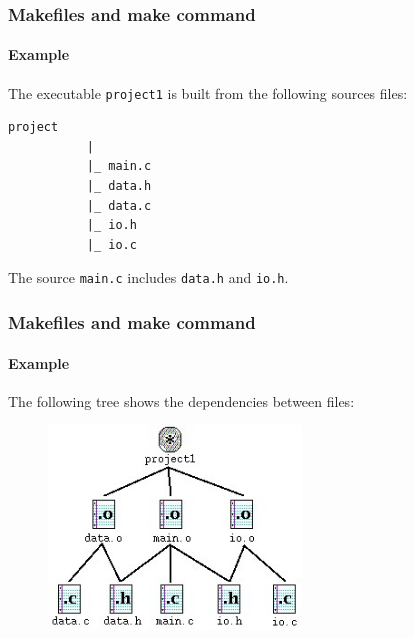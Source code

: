 \documentclass[11pt]{beamer}
\begin{document}

\lstset{%
     showstringspaces = false,
     basicstyle=\small\ttfamily,
   }

\begin{frame}[t,fragile]
  \frametitle{Makefiles and make command}
  \framesubtitle{Example}

  The executable \texttt{project1} is built from the following sources files:

  \vspace{5mm}
  \begin{lstlisting}[language=make]
         project
           |
           |_ main.c
           |_ data.h
           |_ data.c
           |_ io.h
           |_ io.c
  \end{lstlisting}

  \vspace{5mm}
  The source \texttt{main.c} includes \texttt{data.h} and
  \texttt{io.h}.

\end{frame}


\begin{frame}
  \frametitle{Makefiles and make command}
  \framesubtitle{Example}

  The following tree shows the dependencies between files:

  \begin{figure}[!htb]
    \centering
    \includegraphics[width=0.6\textwidth]{depgraph}
  \end{figure}

\end{frame}

\end{document}
